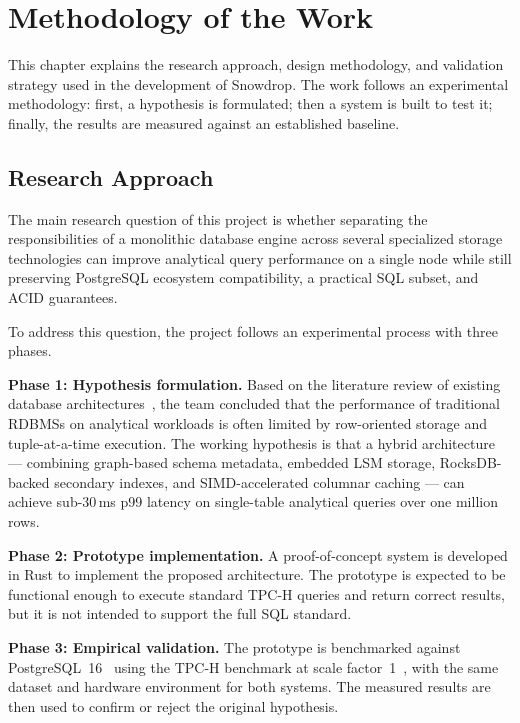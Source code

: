 %
%
\chapter{Methodology of the Work}
\label{chap:methodology}
\setlength{\parskip}{1em}

This chapter explains the research approach, design methodology, and validation strategy used in the development of Snowdrop. The work follows an experimental methodology: first, a hypothesis is formulated; then a system is built to test it; finally, the results are measured against an established baseline.

\section{Research Approach}

The main research question of this project is whether separating the responsibilities of a monolithic database engine across several specialized storage technologies can improve analytical query performance on a single node while still preserving PostgreSQL ecosystem compatibility, a practical SQL subset, and ACID guarantees.

To address this question, the project follows an experimental process with three phases.

\textbf{Phase 1: Hypothesis formulation.} Based on the literature review of existing database architectures~\cite{abadi2013, oneil1996, robinson2015}, the team concluded that the performance of traditional RDBMSs on analytical workloads is often limited by row-oriented storage and tuple-at-a-time execution. The working hypothesis is that a hybrid architecture --- combining graph-based schema metadata, embedded LSM storage, RocksDB-backed secondary indexes, and SIMD-accelerated columnar caching --- can achieve sub-30\,ms p99 latency on single-table analytical queries over one million rows.

\textbf{Phase 2: Prototype implementation.} A proof-of-concept system is developed in Rust to implement the proposed architecture. The prototype is expected to be functional enough to execute standard TPC-H queries and return correct results, but it is not intended to support the full SQL standard.

\textbf{Phase 3: Empirical validation.} The prototype is benchmarked against PostgreSQL~16~\cite{postgresql2026} using the TPC-H benchmark at scale factor~1~\cite{tpch2024}, with the same dataset and hardware environment for both systems. The measured results are then used to confirm or reject the original hypothesis.


